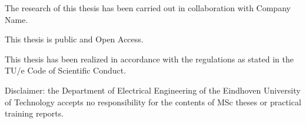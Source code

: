 \documentclass[12pt,a4paper]{article}
\begin{document}
\vspace{1cm}

{\small The research of this thesis has been carried out in collaboration with Company Name.}

\vspace{0.4cm}
{\small This thesis is public and Open Access.}

\vspace{0.4cm}
{\small This thesis has been realized in accordance with the regulations as stated in the TU/e Code of Scientific Conduct.}

\vspace{0.4cm}

{\small Disclaimer: the Department of Electrical Engineering of the Eindhoven University of Technology accepts no responsibility for the contents of MSc theses or practical training reports.}

\vfill
\end{document}
